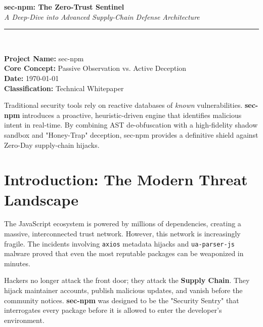 \documentclass[12pt,a4paper]{article}
\begin{document}
\begin{titlepage}
    \centering
    \vspace*{2cm}
    {\Huge \textbf{sec-npm: The Zero-Trust Sentinel}} \\
    \vspace{0.5cm}
    {\large \textit{A Deep-Dive into Advanced Supply-Chain Defense Architecture}} \\
    \vspace{1.5cm}
    \rule{\linewidth}{2pt} \\
    \vspace{1cm}
    \begin{flushleft}
        \textbf{Project Name:} sec-npm \\
        \textbf{Core Concept:} Passive Observation vs. Active Deception \\
        \textbf{Date:} \today \\
        \textbf{Classification:} Technical Whitepaper
    \end{flushleft}
    \vfill
    \begin{tcolorbox}[colback=seclightblue,colframe=secblue,title=Executive Summary]
        Traditional security tools rely on reactive databases of \textit{known} vulnerabilities. \textbf{sec-npm} introduces a proactive, heuristic-driven engine that identifies malicious intent in real-time. By combining AST de-obfuscation with a high-fidelity shadow sandbox and "Honey-Trap" deception, sec-npm provides a definitive shield against Zero-Day supply-chain hijacks.
    \end{tcolorbox}
\end{titlepage}

\tableofcontents
\newpage

\section{Introduction: The Modern Threat Landscape}
The JavaScript ecosystem is powered by millions of dependencies, creating a massive, interconnected trust network. However, this network is increasingly fragile. The incidents involving \texttt{axios} metadata hijacks and \texttt{ua-parser-js} malware proved that even the most reputable packages can be weaponized in minutes. 

Hackers no longer attack the front door; they attack the \textbf{Supply Chain}. They hijack maintainer accounts, publish malicious updates, and vanish before the community notices. \textbf{sec-npm} was designed to be the "Security Sentry" that interrogates every package before it is allowed to enter the developer's environment.
\end{document}
